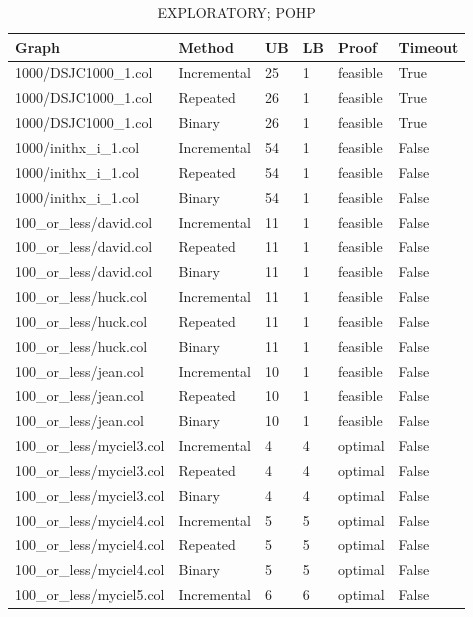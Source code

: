 \begin{table}[htbp]
\centering
\caption{EXPLORATORY; POHP}
\label{tab:p2a-POHP-exploratory-results}
\begin{tabular}{llllll}
\hline
Graph & Method & UB & LB & Proof & Timeout \\
\hline
1000/DSJC1000\_1.col & Incremental & 25 & 1 & feasible & True \\
1000/DSJC1000\_1.col & Repeated & 26 & 1 & feasible & True \\
1000/DSJC1000\_1.col & Binary & 26 & 1 & feasible & True \\
1000/inithx\_i\_1.col & Incremental & 54 & 1 & feasible & False \\
1000/inithx\_i\_1.col & Repeated & 54 & 1 & feasible & False \\
1000/inithx\_i\_1.col & Binary & 54 & 1 & feasible & False \\
100\_or\_less/david.col & Incremental & 11 & 1 & feasible & False \\
100\_or\_less/david.col & Repeated & 11 & 1 & feasible & False \\
100\_or\_less/david.col & Binary & 11 & 1 & feasible & False \\
100\_or\_less/huck.col & Incremental & 11 & 1 & feasible & False \\
100\_or\_less/huck.col & Repeated & 11 & 1 & feasible & False \\
100\_or\_less/huck.col & Binary & 11 & 1 & feasible & False \\
100\_or\_less/jean.col & Incremental & 10 & 1 & feasible & False \\
100\_or\_less/jean.col & Repeated & 10 & 1 & feasible & False \\
100\_or\_less/jean.col & Binary & 10 & 1 & feasible & False \\
100\_or\_less/myciel3.col & Incremental & 4 & 4 & optimal & False \\
100\_or\_less/myciel3.col & Repeated & 4 & 4 & optimal & False \\
100\_or\_less/myciel3.col & Binary & 4 & 4 & optimal & False \\
100\_or\_less/myciel4.col & Incremental & 5 & 5 & optimal & False \\
100\_or\_less/myciel4.col & Repeated & 5 & 5 & optimal & False \\
100\_or\_less/myciel4.col & Binary & 5 & 5 & optimal & False \\
100\_or\_less/myciel5.col & Incremental & 6 & 6 & optimal & False \\

\end{tabular}
\end{table}
